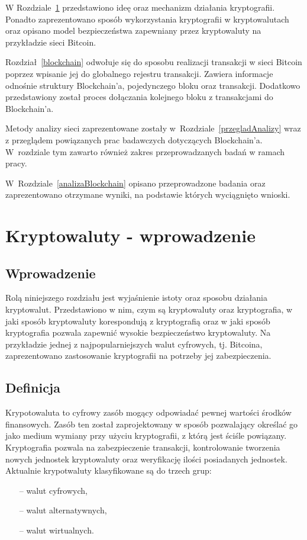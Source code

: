\documentclass[12pt, oneside, final, openany]{mgr}
\begin{document}
\indent W Rozdziale~\ref{kryptowaulty} przedstawiono ideę oraz mechanizm działania kryptografii. Ponadto zaprezentowano sposób wykorzystania kryptografii w kryptowalutach oraz opisano model bezpieczeństwa zapewniany przez kryptowaluty na przykładzie sieci Bitcoin.

\indent Rozdział~\ref{blockchain} odwołuje się do sposobu realizacji transakcji w sieci Bitcoin poprzez wpisanie jej do globalnego rejestru transakcji. Zawiera informacje odnośnie struktury Blockchain'a, pojedynczego bloku oraz transakcji. Dodatkowo przedstawiony został proces dołączania kolejnego bloku z transakcjami do Blockchain'a.

\indent Metody analizy sieci zaprezentowane zostały w~Rozdziale~\ref{przegladAnalizy} wraz z przeglądem powiązanych prac badawczych dotyczących Blockchain'a. W~rozdziale tym zawarto również zakres przeprowadzanych badań w ramach pracy.

\indent W~Rozdziale~\ref{analizaBlockchain} opisano przeprowadzone badania oraz zaprezentowano otrzymane wyniki, na podstawie których wyciągnięto wnioski.

\chapter{Kryptowaluty - wprowadzenie}
\label{kryptowaulty}
\section{Wprowadzenie} 
\label{sec:KryptowalutyWprowadzenie}
\indent Rolą niniejszego rozdziału jest wyjaśnienie istoty oraz sposobu działania kryptowalut. Przedstawiono w nim, czym są kryptowaluty oraz kryptografia, w jaki sposób kryptowaluty korespondują z kryptografią oraz w jaki sposób kryptografia pozwala zapewnić wysokie bezpieczeństwo kryptowaluty. Na przykładzie jednej z najpopularniejszych walut cyfrowych, tj. Bitcoina, zaprezentowano zastosowanie kryptografii na potrzeby jej zabezpieczenia.

\section{Definicja} \label{sec:definicjaKryptowaluty}
\indent Krypotowaluta to cyfrowy zasób mogący odpowiadać pewnej wartości środków finansowych. Zasób ten został zaprojektowany w sposób pozwalający określać go jako medium wymiany przy użyciu kryptografii, z którą jest ściśle powiązany. Kryptografia pozwala na zabezpieczenie transakcji, kontrolowanie tworzenia nowych jednostek kryptowaluty oraz weryfikację ilości posiadanych jednostek. Aktualnie krypotwaluty klasyfikowane są do trzech grup:
\begin{itemize}
\item[--] walut cyfrowych,
\item[--] walut alternatywnych,
\item[--] walut wirtualnych.
\end{itemize}
\end{document}
